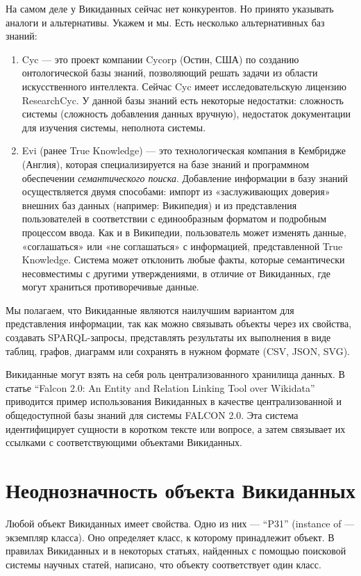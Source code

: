 На самом деле у Викиданных сейчас нет конкурентов. Но принято указывать аналоги и альтернативы. Укажем и мы. Есть несколько альтернативных баз знаний:
\begin{enumerate}
\item Cyc — это проект компании Cycorp (Остин, США) по созданию онтологической базы знаний, позволяющий решать задачи из области искусственного интеллекта\cite{Cyc}. Сейчас Cyc имеет исследовательскую лицензию ResearchCyc. У данной базы знаний есть некоторые недостатки: сложность системы (сложность добавления данных
вручную), недостаток документации для изучения системы, неполнота системы.
\item Evi (ранее True Knowledge\cite{True_Knowledge}) --- это технологическая компания в Кембридже (Англия), которая специализируется на базе знаний и программном обеспечении \textit{семантического поиска}\footnotemark.  Добавление информации в базу знаний осуществляется двумя способами: импорт из «заслуживающих доверия» внешних баз данных (например: Википедия) и из представления пользователей в соответствии с единообразным форматом и подробным процессом ввода. Как и в Википедии, пользователь может изменять
данные, «соглашаться» или «не соглашаться» с информацией, представленной True Knowledge. Система может отклонить любые факты, которые семантически несовместимы с другими утверждениями, в отличие от Викиданных, где могут
храниться противоречивые данные.
\end{enumerate}
Мы полагаем, что Викиданные являются наилучшим вариантом для представления информации, так как можно связывать объекты через их свойства\footnotemark {}, создавать SPARQL-запросы, представлять результаты их выполнения в виде таблиц, графов, диаграмм или сохранять в нужном формате (CSV, JSON, SVG).

Викиданные могут взять на себя роль централизованного хранилища данных. В статье ``Falcon 2.0: An Entity and Relation Linking Tool over Wikidata''\cite{Falcon_2.0} приводится пример использования Викиданных в качестве централизованной и общедоступной базы знаний для системы FALCON 2.0. Эта система идентифицирует сущности в коротком тексте или вопросе, а затем связывает их ссылками с соответствующими объектами Викиданных.
\section{Неоднозначность объекта Викиданных}
Любой объект Викиданных имеет свойства. Одно из них --- ``P31'' (instance of --- экземпляр класса). Оно определяет класс, к которому принадлежит объект. В правилах Викиданных и в некоторых статьях\cite{BabelNet}, найденных с помощью поисковой системы научных статей\footnotemark {}, написано, что объекту соответствует один класс.

